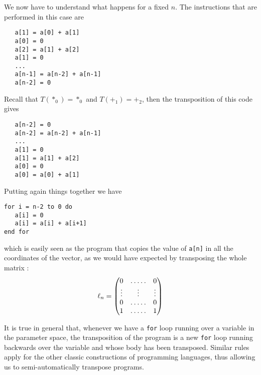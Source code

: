\documentclass{article}
\begin{document}
  We now have to understand what happens for a fixed $n$. The
  instructions that are performed in this case are
  \begin{center}
    \begin{minipage}{0.7\textwidth}
\begin{verbatim}
   a[1] = a[0] + a[1]
   a[0] = 0
   a[2] = a[1] + a[2]
   a[1] = 0
   ...
   a[n-1] = a[n-2] + a[n-1]
   a[n-2] = 0
\end{verbatim}
    \end{minipage}
  \end{center}
  Recall that $T(*_0) = *_0$ and $T(+_1) = +_2$, then the
  transposition of this code gives
  \begin{center}
    \begin{minipage}{0.7\textwidth}
\begin{verbatim}
   a[n-2] = 0
   a[n-2] = a[n-2] + a[n-1]
   ...
   a[1] = 0
   a[1] = a[1] + a[2]
   a[0] = 0
   a[0] = a[0] + a[1]
\end{verbatim}
    \end{minipage}
  \end{center}
  Putting again things together we have
  \begin{center}
    \begin{minipage}{0.7\textwidth}
\begin{verbatim}
for i = n-2 to 0 do
   a[i] = 0
   a[i] = a[i] + a[i+1]
end for
\end{verbatim}
    \end{minipage}
  \end{center}
  which is easily seen as the program that copies the value of
  \verb|a[n]| in all the coordinates of the vector, as we would have
  expected by transposing the whole matrix :
  \begin{equation*}
    \ell_n = \begin{pmatrix}
      0 & \hdotsfor{3} & 0\\
      \vdots  &  &\vdots&& \vdots \\
      0 & \hdotsfor{3} & 0\\
      1 & \hdotsfor{3} & 1
    \end{pmatrix}
  \end{equation*}
  
  It is true in general that, whenever we have a \verb|for| loop
  running over a variable in the parameter space, the transposition of
  the program is a new \verb|for| loop running backwards over the
  variable and whose body has been transposed. Similar rules apply for
  the other classic constructions of programming languages, thus
  allowing us to semi-automatically transpose programs.
\end{document}
